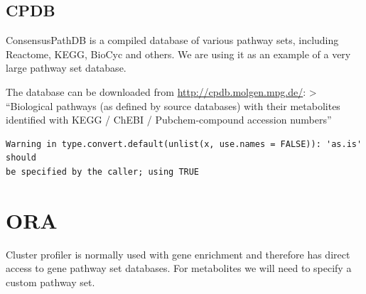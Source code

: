 \documentclass[
  24px,
  letterpaper,
  DIV=11,
  numbers=noendperiod]{scrartcl}
\newenvironment{Shaded}{\begin{snugshade}}{\end{snugshade}}
\newcommand{\AttributeTok}[1]{\textcolor[rgb]{0.40,0.45,0.13}{#1}}
\newcommand{\FunctionTok}[1]{\textcolor[rgb]{0.28,0.35,0.67}{#1}}
\newcommand{\NormalTok}[1]{\textcolor[rgb]{0.00,0.23,0.31}{#1}}
\newcommand{\OtherTok}[1]{\textcolor[rgb]{0.00,0.23,0.31}{#1}}
\newcommand{\SpecialCharTok}[1]{\textcolor[rgb]{0.37,0.37,0.37}{#1}}
\newcommand{\StringTok}[1]{\textcolor[rgb]{0.13,0.47,0.30}{#1}}
\begin{document}
\hypertarget{cpdb}{%
\subsection{CPDB}\label{cpdb}}

ConsensusPathDB is a compiled database of various pathway sets,
including Reactome, KEGG, BioCyc and others. We are using it as an
example of a very large pathway set database.

The database can be downloaded from \url{http://cpdb.molgen.mpg.de/}:
\textgreater{} ``Biological pathways (as defined by source databases)
with their metabolites identified with KEGG / ChEBI / Pubchem-compound
accession numbers''

\begin{Shaded}
\end{Shaded}

\begin{verbatim}
Warning in type.convert.default(unlist(x, use.names = FALSE)): 'as.is' should
be specified by the caller; using TRUE
\end{verbatim}

\hypertarget{ora}{%
\section{ORA}\label{ora}}

Cluster profiler is normally used with gene enrichment and therefore has
direct access to gene pathway set databases. For metabolites we will
need to specify a custom pathway set.
\end{document}
